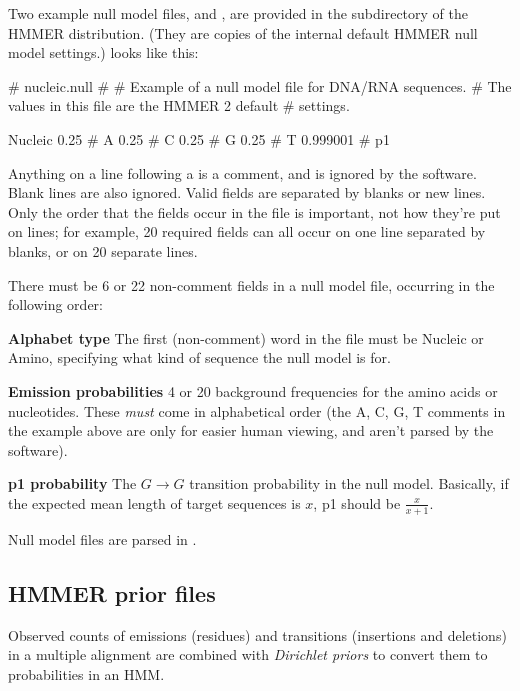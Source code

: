 Two example null model files,  and
, are provided in the  subdirectory
of the HMMER distribution. (They are copies of the internal default
HMMER null model settings.)   looks like this:

\begin{sreoutput}
# nucleic.null
#
# Example of a null model file for DNA/RNA sequences.
# The values in this file are the HMMER 2 default
# settings.

Nucleic
0.25     # A
0.25     # C
0.25     # G
0.25     # T
0.999001 # p1
\end{sreoutput}

Anything on a line following a \prog{\#} is a comment, and is ignored
by the software. Blank lines are also ignored. Valid fields are
separated by blanks or new lines. Only the order that the fields occur
in the file is important, not how they're put on lines; for example,
20 required fields can all occur on one line separated by blanks, or
on 20 separate lines. 

There must be 6 or 22 non-comment fields in a null model file,
occurring in the following order:

\begin{wideitem}
\item [\textbf{Alphabet type}] The first (non-comment) word in the
file must be Nucleic or Amino, specifying what kind of sequence the
null model is for.

\item [\textbf{Emission probabilities}] 4 or 20 background
frequencies for the amino acids or nucleotides. These \textit{must}
come in alphabetical order (the A, C, G, T comments in the example
above are only for easier human viewing, and aren't parsed by the
software).

\item [\textbf{p1 probability}] The $G \rightarrow G$ transition
probability in the null model. Basically, if the expected mean length
of target sequences is $x$, p1 should be $\frac{x}{x+1}$.
\end{wideitem}

Null model files are parsed in .

\subsection{HMMER prior files}
\label{section:priorfiles}

Observed counts of emissions (residues) and transitions (insertions
and deletions) in a multiple alignment are combined with
\textit{Dirichlet priors} to convert them to probabilities
in an HMM. 

